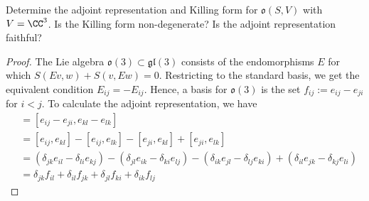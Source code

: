 \documentclass{article}
\newcommand{\mf}{\mathfrak}
\begin{document}
 Determine the adjoint representation and Killing form for $\mf o(S,V)$ with $V=\CC^3$.  Is the Killing form non-degenerate?  Is the adjoint representation faithful? 
\begin{proof}
The Lie algebra $\mf o(3) \subset \mf{gl}(3)$ consists of the endomorphisms $E$ for which $S(Ev,w) + S(v,Ew) = 0$.  Restricting to the standard basis, we get the equivalent condition $E_{ij} = - E_{ij}$.  Hence, a basis for $\mf o(3)$ is the set $f_{ij} := e_{ij} - e_{ji}$ for $i < j$.  To calculate the adjoint representation, we have
\begin{align*}
[f_{ij}, f_{kl}] & = [e_{ij} - e_{ji}, e_{kl} - e_{lk}] \\
& = [e_{ij}, e_{kl}] - [e_{ij}, e_{lk}] - [e_{ji}, e_{kl}] + [e_{ji}, e_{lk}] \\
& = (\delta_{jk} e_{il} - \delta_{li}e_{kj}) - (\delta_{jl} e_{ik} - \delta_{ki}e_{lj}) - (\delta_{ik} e_{jl} - \delta_{lj}e_{ki }) + (\delta_{il} e_{jk} - \delta_{kj}e_{li }) \\
& = \delta_{jk} f_{il} + \delta_{il} f_{jk} + \delta_{jl} f_{ki} + \delta_{ik} f_{lj}
\end{align*}


\end{proof}
\end{document}
